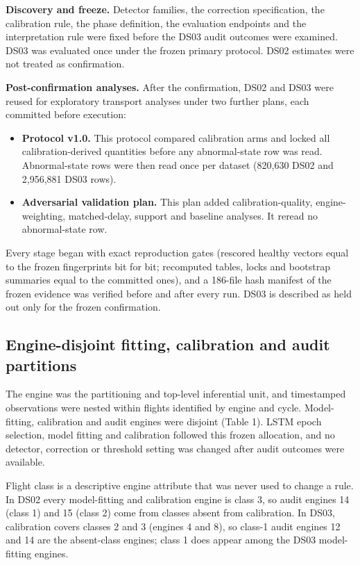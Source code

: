 \documentclass[preprint,11pt,a4paper]{elsarticle}
\begin{document}
\textbf{Discovery and freeze.} Detector families, the correction specification, the calibration rule, the phase definition, the evaluation endpoints and the interpretation rule were fixed before the DS03 audit outcomes were examined. DS03 was evaluated once under the frozen primary protocol. DS02 estimates were not treated as confirmation.

\textbf{Post-confirmation analyses.} After the confirmation, DS02 and DS03 were reused for exploratory transport analyses under two further plans, each committed before execution:
\begin{itemize}
\item \textbf{Protocol v1.0.} This protocol compared calibration arms and locked all calibration-derived quantities before any abnormal-state row was read. Abnormal-state rows were then read once per dataset (820,630 DS02 and 2,956,881 DS03 rows).
\item \textbf{Adversarial validation plan.} This plan added calibration-quality, engine-weighting, matched-delay, support and baseline analyses. It reread no abnormal-state row.
\end{itemize}

Every stage began with exact reproduction gates (rescored healthy vectors equal to the frozen fingerprints bit for bit; recomputed tables, locks and bootstrap summaries equal to the committed ones), and a 186-file hash manifest of the frozen evidence was verified before and after every run. DS03 is described as held out only for the frozen confirmation.

\subsection{Engine-disjoint fitting, calibration and audit partitions}

The engine was the partitioning and top-level inferential unit, and timestamped observations were nested within flights identified by engine and cycle. Model-fitting, calibration and audit engines were disjoint (Table 1). LSTM epoch selection, model fitting and calibration followed this frozen allocation, and no detector, correction or threshold setting was changed after audit outcomes were available.

Flight class is a descriptive engine attribute that was never used to change a rule. In DS02 every model-fitting and calibration engine is class 3, so audit engines 14 (class 1) and 15 (class 2) come from classes absent from calibration. In DS03, calibration covers classes 2 and 3 (engines 4 and 8), so class-1 audit engines 12 and 14 are the absent-class engines; class 1 does appear among the DS03 model-fitting engines.
\end{document}
